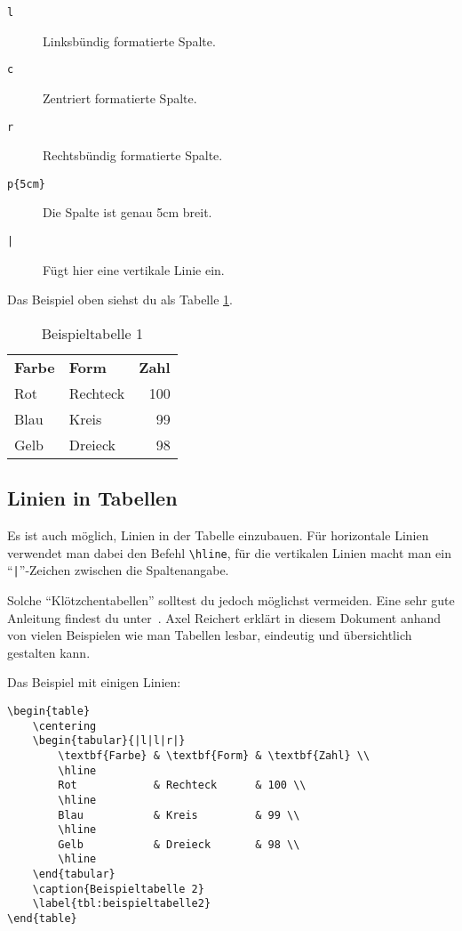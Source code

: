 \begin{description}
	\item[\texttt{l}] Linksbündig formatierte Spalte.
	\item[\texttt{c}] Zentriert formatierte Spalte.
	\item[\texttt{r}] Rechtsbündig formatierte Spalte.
	\item[\texttt{p\{5cm\}}] Die Spalte ist genau 5cm breit.
	\item[\texttt{|}] Fügt hier eine vertikale Linie ein.
\end{description}

Das Beispiel oben siehst du als Tabelle \ref{tbl:beispieltabelle1}.

\begin{table}
	\centering
	\begin{tabular}{llr}
		\textbf{Farbe} & \textbf{Form} & \textbf{Zahl} \\
		Rot            & Rechteck      & 100 \\
		Blau           & Kreis         & 99 \\
		Gelb           & Dreieck       & 98 \\
	\end{tabular}
	\caption{Beispieltabelle 1}
	\label{tbl:beispieltabelle1}
\end{table}

\subsection{Linien in Tabellen}
\label{sec:linienintabellen}

Es ist auch möglich, Linien in der Tabelle einzubauen. Für horizontale Linien verwendet man dabei den Befehl \texttt{\textbackslash hline}, für die vertikalen Linien macht man ein \enquote{\texttt{|}}-Zeichen zwischen die Spaltenangabe.

Solche \enquote{Klötzchentabellen} solltest du jedoch möglichst vermeiden. Eine sehr gute Anleitung findest du unter~\cite{TabSatz}. Axel Reichert erklärt in diesem Dokument anhand von vielen Beispielen wie man Tabellen lesbar, eindeutig und übersichtlich gestalten kann.

Das Beispiel mit einigen Linien:

\begin{lstlisting}
\begin{table}
	\centering
	\begin{tabular}{|l|l|r|}
		\textbf{Farbe} & \textbf{Form} & \textbf{Zahl} \\
		\hline
		Rot            & Rechteck      & 100 \\
		\hline
		Blau           & Kreis         & 99 \\
		\hline
		Gelb           & Dreieck       & 98 \\
		\hline
	\end{tabular}
	\caption{Beispieltabelle 2}
	\label{tbl:beispieltabelle2}
\end{table}
\end{lstlisting}

